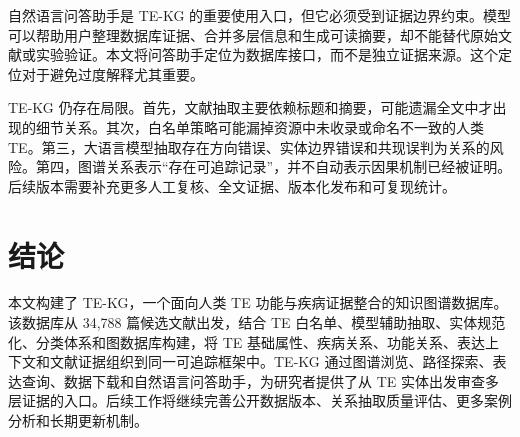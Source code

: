 \documentclass[12pt,a4paper,UTF8]{ctexart}
\begin{document}
自然语言问答助手是 TE-KG 的重要使用入口，但它必须受到证据边界约束。模型可以帮助用户整理数据库证据、合并多层信息和生成可读摘要，却不能替代原始文献或实验验证。本文将问答助手定位为数据库接口，而不是独立证据来源。这个定位对于避免过度解释尤其重要。

TE-KG 仍存在局限。首先，文献抽取主要依赖标题和摘要，可能遗漏全文中才出现的细节关系。其次，白名单策略可能漏掉资源中未收录或命名不一致的人类 TE。第三，大语言模型抽取存在方向错误、实体边界错误和共现误判为关系的风险。第四，图谱关系表示“存在可追踪记录”，并不自动表示因果机制已经被证明。后续版本需要补充更多人工复核、全文证据、版本化发布和可复现统计。

\section{结论}

本文构建了 TE-KG，一个面向人类 TE 功能与疾病证据整合的知识图谱数据库。该数据库从 34,788 篇候选文献出发，结合 TE 白名单、模型辅助抽取、实体规范化、分类体系和图数据库构建，将 TE 基础属性、疾病关系、功能关系、表达上下文和文献证据组织到同一可追踪框架中。TE-KG 通过图谱浏览、路径探索、表达查询、数据下载和自然语言问答助手，为研究者提供了从 TE 实体出发审查多层证据的入口。后续工作将继续完善公开数据版本、关系抽取质量评估、更多案例分析和长期更新机制。

\end{document}
